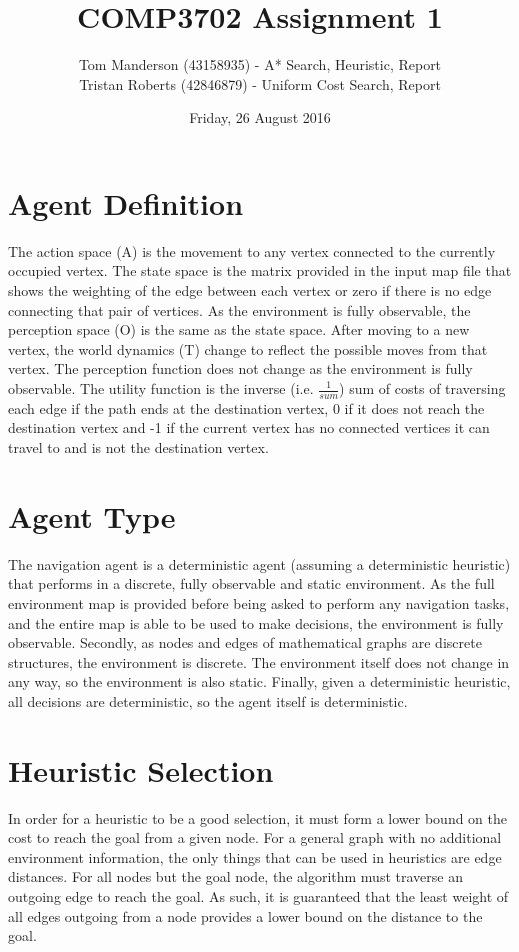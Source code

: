 \documentclass[11pt,a4paper]{article}
\title{COMP3702 Assignment 1}
\author{
Tom Manderson (43158935) - A* Search, Heuristic, Report
\\
Tristan Roberts (42846879) - Uniform Cost Search, Report
}
\date{Friday, 26 August 2016}
\begin{document}
\maketitle
\tableofcontents
\clearpage

\section{Agent Definition}
The action space (A) is the movement to any vertex connected to the currently occupied vertex. The state space is the matrix provided in the input map file that shows the weighting of the edge between each vertex or zero if there is no edge connecting that pair of vertices. As the environment is fully observable, the perception space (O) is the same as the state space. After moving to a new vertex, the world dynamics (T) change to reflect the possible moves from that vertex. The perception function does not change as the environment is fully observable. The utility function is the inverse (i.e. \(\frac{1}{sum}\)) sum of costs of traversing each edge if the path ends at the destination vertex, 0 if it does not reach the destination vertex and -1 if the current vertex has no connected vertices it can travel to and is not the destination vertex.

\section{Agent Type}
The navigation agent is a deterministic agent (assuming a deterministic heuristic) that performs in a discrete, fully observable and static environment. As the full environment map is provided before being asked to perform any navigation tasks, and the entire map is able to be used to make decisions, the environment is fully observable. Secondly, as nodes and edges of mathematical graphs are discrete structures, the environment is discrete. The environment itself does not change in any way, so the environment is also static. Finally, given a deterministic heuristic, all decisions are deterministic, so the agent itself is deterministic.


\section{Heuristic Selection}
In order for a heuristic to be a good selection, it must form a lower bound on the cost to reach the goal from a given node. For a general graph with no additional environment information, the only things that can be used in heuristics are edge distances. For all nodes but the goal node, the algorithm must traverse an outgoing edge to reach the goal. As such, it is guaranteed that the least weight of all edges outgoing from a node provides a lower bound on the distance to the goal.
\end{document}
